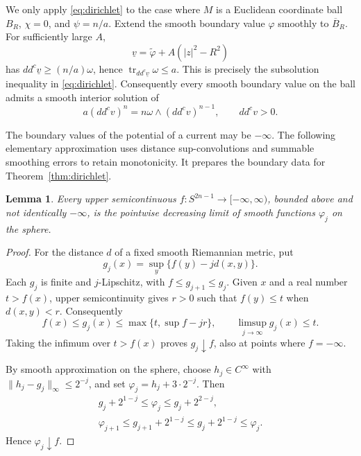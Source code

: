 \documentclass[reqno]{amsart}
\numberwithin{equation}{section}
\newtheorem{lemma}[theorem]{Lemma}
\theoremstyle{definition}
\DeclareMathOperator{\tr}{tr}
\begin{document}
We only apply \eqref{eq:dirichlet} to the case where $M$ is a Euclidean coordinate ball $B_R$, $\chi=0$, and $\psi=n/a$. Extend the smooth boundary value $\varphi$ smoothly to $\overline B_R$. For sufficiently large $A$,
\[
\underline v=\widetilde\varphi+A(|z|^2-R^2)
\]
has $dd^c\underline v\geq(n/a)\omega$, hence
$\tr_{dd^c\underline v}\omega\leq a$. This is precisely the subsolution inequality in \eqref{eq:dirichlet}. Consequently every smooth boundary value on the ball admits a smooth interior solution of
\begin{equation}\label{eq:ball-equation}
a(dd^cv)^n=n\omega\wedge(dd^cv)^{n-1},
\qquad dd^cv>0.
\end{equation}

The boundary values of the potential of a current may be $-\infty$.
The following elementary approximation uses distance
sup-convolutions and summable smoothing errors to retain
monotonicity. It prepares the boundary data for
Theorem~\ref{thm:dirichlet}.
\begin{lemma}\label{lem:boundary-data}
Every upper semicontinuous $f:S^{2n-1}\to[-\infty,\infty)$, bounded above and not identically $-\infty$, is the pointwise decreasing limit of smooth functions $\varphi_j$ on the sphere.
\end{lemma}
\begin{proof}

For the distance $d$ of a fixed smooth Riemannian metric, put
\[
g_j(x)=\sup_y\{f(y)-j d(x,y)\}.
\]
Each $g_j$ is finite and $j$-Lipschitz, with
$f\le g_{j+1}\le g_j$.
Given $x$ and a real number $t>f(x)$, upper semicontinuity
gives $r>0$ such that $f(y)\le t$ when $d(x,y)<r$.
Consequently
\[
f(x)\le g_j(x)
\le\max\{t,\sup f-jr\},
\qquad
\limsup_{j\to\infty}g_j(x)\le t.
\]
Taking the infimum over $t>f(x)$ proves $g_j\downarrow f$,
also at points where $f=-\infty$.

By smooth approximation on the sphere, choose $h_j\in C^\infty$
with $\|h_j-g_j\|_\infty\le2^{-j}$, and set
$\varphi_j=h_j+3\cdot2^{-j}$. Then
\[
\begin{gathered}
g_j+2^{1-j}\le\varphi_j\le g_j+2^{2-j},\\
\varphi_{j+1}\le g_{j+1}+2^{1-j}
\le g_j+2^{1-j}\le\varphi_j.
\end{gathered}
\]
Hence $\varphi_j\downarrow f$.\qedhere
\end{proof}
\end{document}
